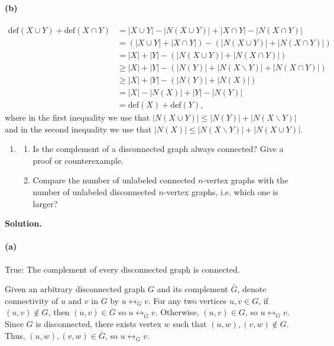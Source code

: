 \documentclass[11pt,letterpaper]{article}
\theoremstyle{definition}
\newcommand{\solution}{\medskip\noindent\textbf{Solution.}\par\medskip}
\begin{document}
\paragraph{(b)}
\begin{align*}
    \mathrm{def}(X\cup Y) + \mathrm{def}(X\cap Y) & = |X\cup Y| - |N(X\cup Y)| + |X\cap Y| - |N(X\cap Y)| \\
    & = (|X\cup Y| + |X\cap Y|) -  (|N(X\cup Y)| + |N(X\cap Y)|)\\
    & = |X| + |Y| -  (|N(X\cup Y)| + |N(X\cap Y)|)\\
    &\geq |X| + |Y| -  (|N(Y)| + |N(X\backslash Y)| + |N(X\cap Y)|)\\
    &\geq |X| + |Y| -  (|N(Y)| + |N(X)|)\\
    & = |X| - |N(X)| + |Y| - |N(Y)| \\
    & = \mathrm{def}(X) + \mathrm{def}(Y),
\end{align*}
where in the first inequality we use that $|N(X\cup Y)|\leq |N(Y)| + |N(X\backslash Y)|$ and in the second inequality we use that $|N(X)|\leq |N(X\backslash Y)| + |N(X\cup Y)|$.

\begin{enumerate}[resume]
\item[9.*]
\begin{enumerate}
\item Is the complement of a disconnected graph always connected? Give a proof or counterexample.
\item Compare the number of unlabeled connected $n$-vertex graphs with the number of unlabeled disconnected $n$-vertex graphs, i.e. which one is larger?
\end{enumerate}
\end{enumerate}

\solution
\paragraph{(a)}
True: The complement of every disconnected graph is connected.

Given an arbitrary disconnected graph $G$ and its complement $\bar{G}$, denote connectivity of $u$ and $v$ in $G$ by $u\leftrightarrow_G v$.
For any two vertices $u,v\in G$, if $(u,v)\notin G$, then $(u,v)\in \bar{G}$ so $u\leftrightarrow_{\bar{G}}v$. 
Otherwise, $(u,v)\in G$, so $u\leftrightarrow_G v$. 
Since $G$ is disconnected, there exists vertex $w$ such that $(u,w),(v,w)\notin G$.
Thus, $(u,w),(v,w)\in \bar{G}$, so $u\leftrightarrow_{\bar{G}}v$.
\end{document}
